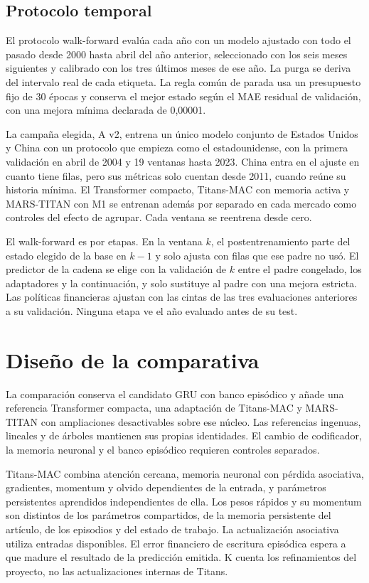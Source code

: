 \documentclass[11pt,a4paper]{report}
\begin{document}
\section{Protocolo temporal}
El protocolo walk-forward evalúa cada año con un modelo ajustado con todo el
pasado desde 2000 hasta abril del año anterior, seleccionado con los seis
meses siguientes y calibrado con los tres últimos meses de ese año. La purga se
deriva del intervalo real de cada etiqueta. La regla común de parada usa un
presupuesto fijo de 30 épocas y conserva el mejor estado según el MAE residual
de validación, con una mejora mínima declarada de 0,00001.

La campaña elegida, A v2, entrena un único modelo conjunto de Estados Unidos y
China con un protocolo que empieza como el estadounidense, con la primera
validación en abril de 2004 y 19 ventanas hasta 2023. China entra en el ajuste
en cuanto tiene filas, pero sus métricas solo cuentan desde 2011, cuando
reúne su historia mínima. El Transformer compacto, Titans-MAC con memoria
activa y MARS-TITAN con M1 se entrenan además por separado en cada mercado
como controles del efecto de agrupar. Cada ventana se reentrena desde cero.

El walk-forward es por etapas. En la ventana $k$, el postentrenamiento parte
del estado elegido de la base en $k-1$ y solo ajusta con filas que ese padre
no usó. El predictor de la cadena se elige con la validación de $k$ entre el
padre congelado, los adaptadores y la continuación, y solo sustituye al padre
con una mejora estricta. Las políticas financieras ajustan con las cintas de
las tres evaluaciones anteriores a su validación. Ninguna etapa ve el año
evaluado antes de su test.

\chapter{Diseño de la comparativa}
\label{cap:diseno}
La comparación conserva el candidato GRU con banco episódico y añade una
referencia Transformer compacta, una adaptación de Titans-MAC y MARS-TITAN con
ampliaciones desactivables sobre ese núcleo. Las referencias ingenuas, lineales
y de árboles mantienen sus propias identidades. El cambio de codificador,
la memoria neuronal y el banco episódico requieren controles separados.

Titans-MAC combina atención cercana, memoria neuronal con pérdida asociativa,
gradientes, momentum y olvido dependientes de la entrada, y parámetros
persistentes aprendidos independientes de ella. Los pesos rápidos y su momentum
son distintos de los parámetros compartidos, de la memoria persistente del
artículo, de los episodios y del estado de trabajo. La actualización asociativa
utiliza entradas disponibles. El error financiero de escritura episódica espera
a que madure el resultado de la predicción emitida. K cuenta los refinamientos
del proyecto, no las actualizaciones internas de Titans.
\end{document}
